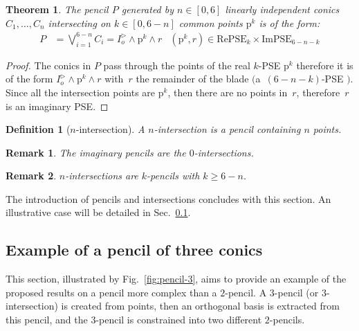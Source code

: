 \documentclass{birkjour}
\newtheorem{theorem}{Theorem}
\newtheorem{definition}{Definition}
\newtheorem{remark}{Remark}
\begin{document}
\begin{theorem}
    The pencil \(P\) generated by \(n\in[0,6]\) linearly independent conics \(C_1,\dots,C_{n}\) intersecting on \(k\in[0,6-n]\) common points \(\mathrm{p}^k\) is of the form:
    \begin{align}
        P &= \bigvee_{i=1}^{6-n} C_i = I_o^\triangleright \wedge \mathrm{p}^k\wedge r & (\mathrm{p}^k,r)\in \mathrm{RePSE}_k\times\mathrm{ImPSE}_{6-n-k}     
    \end{align}
\end{theorem}
\begin{proof}
    The conics in \(P\) pass through the points of the real \(k\)-PSE \(\mathrm{p}^k\) therefore it is of the form \(I_o^\triangleright \wedge \mathrm{p}^k \wedge r\) with~\(r\) the remainder of the blade $\big($a~\((6-n-k)\)-PSE $\big)$. Since all the intersection points are \(\mathrm{p}^k\), then there are no points in~\(r\), therefore~\(r\) is an imaginary PSE.
\end{proof}

\begin{definition}[\(n\)-intersection]
A \(n\)-intersection is a pencil containing \(n\) points.
\end{definition}

\begin{remark}
The imaginary pencils are the \(0\)-intersections.
\end{remark}
\begin{remark}
\(n\)-intersections are \(k\)-pencils with \(k \ge 6-n\).
\end{remark}
\noindent The introduction of pencils and intersections concludes with this section. An illustrative case will be detailed in Sec.~\ref{sec:example-3-pencil}.



\subsection{Example of a pencil of three conics}
\label{sec:example-3-pencil}
This section, illustrated by Fig.~\ref{fig:pencil-3}, aims to provide an example of the proposed results on a pencil more complex than a \(2\)-pencil. A \(3\)-pencil (or \(3\)-intersection) is created from points, then an orthogonal basis is extracted from this pencil, and the \(3\)-pencil is constrained into two different \(2\)-pencils.
\end{document}
